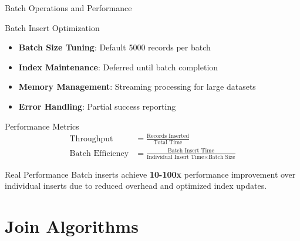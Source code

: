 \documentclass[aspectratio=169]{beamer}
\begin{document}
\begin{frame}{Batch Operations and Performance}
\begin{block}{Batch Insert Optimization}
\begin{itemize}
    \item \textbf{Batch Size Tuning}: Default 5000 records per batch
    \item \textbf{Index Maintenance}: Deferred until batch completion
    \item \textbf{Memory Management}: Streaming processing for large datasets
    \item \textbf{Error Handling}: Partial success reporting
\end{itemize}
\end{block}

\begin{block}{Performance Metrics}
\begin{align}
\text{Throughput} &= \frac{\text{Records Inserted}}{\text{Total Time}} \\
\text{Batch Efficiency} &= \frac{\text{Batch Insert Time}}{\text{Individual Insert Time} \times \text{Batch Size}}
\end{align}
\end{block}

\begin{alertblock}{Real Performance}
Batch inserts achieve \textbf{10-100x} performance improvement over individual inserts due to reduced overhead and optimized index updates.
\end{alertblock}
\end{frame}

\section{Join Algorithms}
\end{document}
